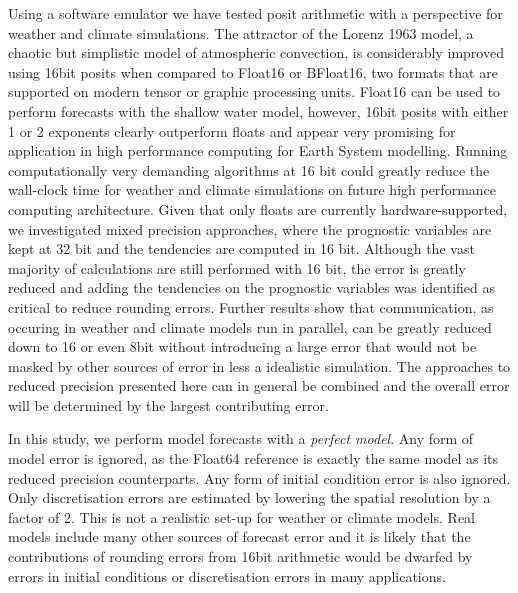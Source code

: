 \documentclass[draft]{agujournal2019}
\begin{document}
Using a software emulator we have tested posit arithmetic with a perspective for weather and climate simulations. The attractor of the Lorenz 1963 model, a chaotic but simplistic model of atmospheric convection, is considerably improved using 16bit posits when compared to Float16 or BFloat16, two formats that are supported on modern tensor or graphic processing units. Float16 can be used to perform forecasts with the shallow water model, however, 16bit posits with either 1 or 2 exponents clearly outperform floats and appear very promising for application in high performance computing for Earth System modelling. Running computationally very demanding algorithms at 16 bit could greatly reduce the wall-clock time for weather and climate simulations on future high performance computing architecture. Given that only floats are currently hardware-supported, we investigated mixed precision approaches, where the prognostic variables are kept at 32 bit and the tendencies are computed in 16 bit. Although the vast majority of calculations are still performed with 16 bit, the error is greatly reduced and adding the tendencies on the prognostic variables was identified as critical to reduce rounding errors. Further results show that communication, as occuring in weather and climate models run in parallel, can be greatly reduced down to 16 or even 8bit without introducing a large error that would not be masked by other sources of error in less a idealistic simulation. The approaches to reduced precision presented here can in general be combined and the overall error will be determined by the largest contributing error.

In this study, we perform model forecasts with a \emph{perfect model}. Any form of model error is ignored, as the Float64 reference is exactly the same model as its reduced precision counterparts. Any form of initial condition error is also ignored. Only discretisation errors are estimated by lowering the spatial resolution by a factor of 2. This is not a realistic set-up for weather or climate models. Real models include many other sources of forecast error and it is likely that the contributions of rounding errors from 16bit arithmetic would be dwarfed by errors in initial conditions or discretisation errors in many applications. 
\end{document}
